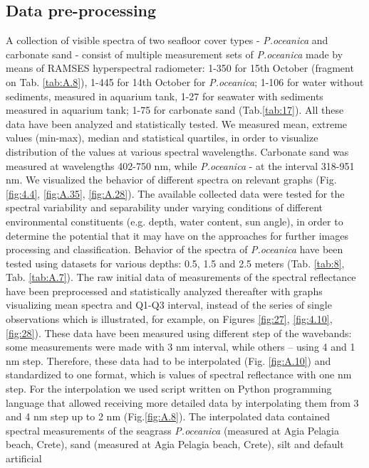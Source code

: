 \documentclass[11pt]{article}
\begin{document}
\subsection{Data pre-processing}
A collection of visible spectra of two seafloor cover types - \textit{P.oceanica} and carbonate sand - consist of multiple measurement sets of \textit{P.oceanica} made by means of RAMSES hyperspectral radiometer: 1-350 for 15th October (fragment on Tab. \ref{tab:A.8}), 1-445 for 14th October for \textit{P.oceanica}; 1-106 for water without sediments, measured in aquarium tank, 1-27 for seawater with sediments measured in aquarium tank; 1-75 for carbonate sand (Tab.\ref{tab:17}). All these data have been analyzed and statistically tested. We measured mean, extreme values (min-max), median and statistical quartiles, in order to visualize distribution of the values at various spectral wavelengths. Carbonate sand was measured at wavelengths 402-750 nm, while \textit{P.oceanica} - at the interval 318-951 nm. We visualized the behavior of different spectra on relevant graphs (Fig. \ref{fig:4.4}, \ref{fig:A.35}, \ref{fig:A.28}).\label{page-28}
The available collected data were tested for the spectral variability and separability under varying conditions of different environmental
constituents (e.g. depth, water content, sun angle), in order to determine the
potential that it may have on the approaches for further images processing and classification. Behavior of the spectra of \textit{P.oceanica} have been tested using datasets for various depths: 0.5, 1.5 and 2.5 meters (Tab. \ref{tab:8}, Tab. \ref{tab:A.7}). The raw
initial data of measurements of the spectral reflectance have been preprocessed and statistically analyzed thereafter with graphs visualizing mean spectra and Q1-Q3 interval, instead of the series of single observations which is illustrated, for example, on Figures \ref{fig:27}, \ref{fig:4.10}, \ref{fig:28}). These data have been measured using different step of the wavebands: some measurements
were made with 3 nm interval, while others – using 4 and 1 nm step.
Therefore, these data had to be interpolated (Fig. \ref{fig:A.10}) and standardized to one
format, which is values of spectral reflectance with one nm step. For the
interpolation we used script written on Python programming language that allowed receiving more 
detailed data by interpolating them from 3 and 4 nm step up to 2 nm (Fig.\ref{fig:A.8}).
The interpolated data contained spectral measurements of the seagrass 	\textit{P.oceanica} (measured at Agia
Pelagia beach, Crete), sand (measured at Agia Pelagia beach, Crete), silt and default artificial
\end{document}
